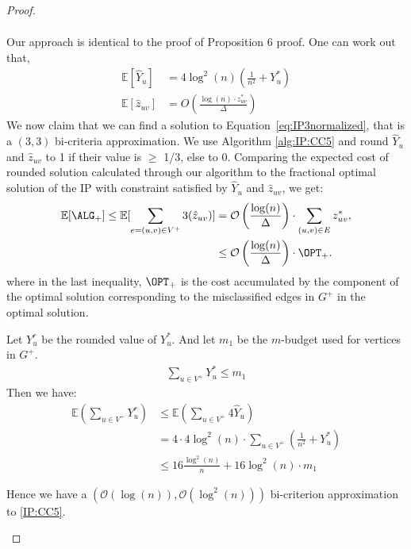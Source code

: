 \begin{proof}
\begin{enumerate}
\begin{align}
	\end{align}
	Our approach is identical to the proof of Proposition 6 proof. One can work out that,
	\begin{align*}
	    \mathbb{E} [\hat{Y}_{u}] &= 4 \log^2(n)\left(\frac{1}{n^2} + Y_u^* \right)\\
	    \mathbb{E} [\hat{z}_{uv}] &= O \left(\frac{ \log(n)\cdot z^*_{uv}}{\Delta} \right)
	\end{align*}
	We now claim that we can find a solution to Equation~\ref{eq:IP3normalized}, that is a $(3,3)$ bi-criteria approximation. We use Algorithm \ref{alg:IP:CC5} and round $\hat{Y}_u$ and $\hat{z}_{uv}$ to 1 if their value is $\geq$ 1/3, else to $0$. Comparing the expected cost of rounded solution calculated through our algorithm to the fractional optimal solution of the IP with constraint satisfied by $\hat{Y}_u$ and $\hat{z}_{uv}$, we get:
	\begin{align*}
	    \mathbb{E}[\ALG_+] \leq \mathbb{E} [\sum_{e=(u,v)\in V^+} 3(\hat{z}_{uv})] &= \mathcal{O} \left( \frac{ \log(n)}{\Delta} \right) \cdot \sum_{(u,v) \in E} z^*_{uv},\\
	    &\leq \mathcal{O} \left(\frac{\log(n)}{\Delta} \right) \cdot \OPT_+.
	\end{align*}
	where in the last inequality, $\OPT_+$ is the cost accumulated by the component of the optimal solution corresponding to the misclassified edges in $G^+$ in the optimal solution.
	
	Let $Y_u^r$ be the rounded value of $Y_u^*$. And let $m_1$ be the $m$-budget used for vertices in $G^+$.
	\begin{align*}
	    \sum_{u\in V^+} Y_u^*\leq m_1
	\end{align*}
	Then we have:
	\begin{align*}
	    \mathbb{E} \left(\sum_{u\in V^+} Y_u^r \right) &\le \mathbb{E} \left( \sum_{u\in V^+} 4\hat{Y}_u \right)\\
	    &=4\cdot 4 \log^2(n) \cdot \sum_{u\in V^+}\left(\frac{1}{n^2} + Y_{u}^* \right)\\
	    &\leq 16\frac{\log^2(n)}{n} + 16 \log^2(n)\cdot m_1
	\end{align*}
	
	Hence we have a $(\mathcal{O}(\log(n)), \mathcal{O}(\log^2(n)))$ bi-criterion approximation to \ref{IP:CC5}.
\end{enumerate}

\end{proof}

